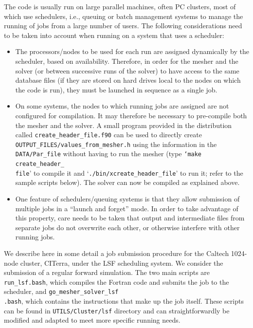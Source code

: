 \documentclass[oneside,english]{book}
\begin{document}
The code is usually run on large parallel machines, often PC clusters,
most of which use schedulers, i.e., queuing or batch management systems
to manage the running of jobs from a large number of users. The following
considerations need to be taken into account when running on a system
that uses a scheduler:

\begin{itemize}
\item The processors/nodes to be used for each run are assigned dynamically
by the scheduler, based on availability. Therefore, in order for the
mesher and the solver (or between successive runs of the solver) to
have access to the same database files (if they are stored on hard
drives local to the nodes on which the code is run), they must be
launched in sequence as a single job.
\item On some systems, the nodes to which running jobs are assigned are
not configured for compilation. It may therefore be necessary to pre-compile
both the mesher and the solver. A small program provided in the distribution
called \texttt{\small create\_header\_file.f90} can be used to directly
create\texttt{\small{} OUTPUT\_FILES/values\_from\_mesher.h} using
the information in the \texttt{\small DATA/Par\_file} without having
to run the mesher (type \texttt{\small `make}{\small{} }\texttt{\small create\_header\_}~\\
\texttt{\small file}' to compile it and `\texttt{\small ./bin/xcreate\_header\_file}'
to run it; refer to the sample scripts below). The solver can now
be compiled as explained above.
\item One feature of schedulers/queuing systems is that they allow submission
of multiple jobs in a {}``launch and forget'' mode. In order to
take advantage of this property, care needs to be taken that output
and intermediate files from separate jobs do not overwrite each other,
or otherwise interfere with other running jobs.
\end{itemize}
We describe here in some detail a job submission procedure for the
Caltech 1024-node cluster, CITerra, under the LSF scheduling system.
We consider the submission of a regular forward simulation. The two
main scripts are \texttt{\small run\_lsf.bash}, which compiles the
Fortran code and submits the job to the scheduler, and \texttt{\small go\_mesher\_solver\_lsf}~\\
\texttt{\small .bash}, which contains the instructions that make up
the job itself. These scripts can be found in \texttt{\small UTILS/Cluster/lsf}
directory and can straightforwardly be modified and adapted to meet
more specific running needs.
\end{document}
